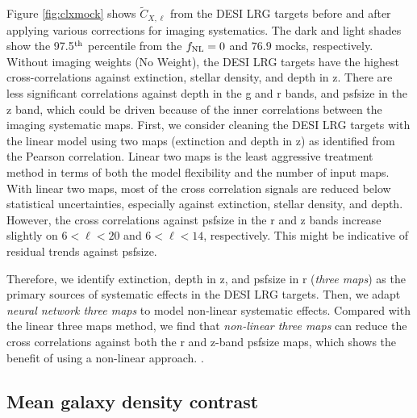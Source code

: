 Figure \ref{fig:clxmock} shows $\tilde{C}_{X,\ell}$ from the DESI LRG targets before and after applying various corrections for imaging systematics. The dark and light shades show the 97.5$^{\rm th}$ percentile from the $f_{\rm NL}=0$ and $76.9$ mocks, respectively. Without imaging weights (No Weight), the DESI LRG targets have the highest cross-correlations against extinction, stellar density, and depth in z. There are less significant correlations against depth in the g and r bands, and psfsize in the z band, which could be driven because of the inner correlations between the imaging systematic maps. First, we consider cleaning the DESI LRG targets with the linear model using two maps (extinction and depth in z) as identified from the Pearson correlation. Linear two maps is the least aggressive treatment method in terms of both the model flexibility and the number of input maps. With linear two maps, most of the cross correlation signals are reduced below statistical uncertainties, especially against extinction, stellar density, and depth. However, the cross correlations against psfsize in the r and z bands increase slightly on $6<\ell<20$ and $6<\ell<14$, respectively. This might be indicative of residual trends against psfsize.

 Therefore, we identify extinction, depth in z, and psfsize in r (\textit{three maps}) as the primary sources of systematic effects in the DESI LRG targets. Then, we adapt \textit{neural network three maps} to model non-linear systematic effects. Compared with the linear three maps method, we find that \textit{non-linear three maps} can reduce the cross correlations against both the r and z-band psfsize maps, which shows the benefit of using a non-linear approach. . 

\subsection{Mean galaxy density contrast}


